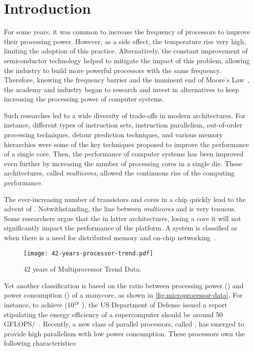 \chapter{Introduction}
\label{ch.intro}

	For some years, it was common to increase the frequency of processors
	to improve their processing power.
	However, as a side effect, the temperature rise very high, limiting the
	adoption of this practice.
	Alternatively, the constant improvement of semiconductor technology helped
	to mitigate the impact of this problem, allowing the industry to build
	more powerful processors with the same frequency.
	Therefore, knowing the frequency barrier and the imminent end of Moore's Law~\cite{moore:1965},
	the academy and industry began to research and invest in alternatives
	to keep increasing the processing power of computer systems.

	Such researches led to a wide diversity of trade-offs in modern architectures.
	For instance, different types of instruction sets, instruction parallelism,
	out-of-order processing techniques, detour prediction techniques, and various
	memory hierarchies were some of the key techniques proposed to improve the
	performance of a single core.
	Then, the performance of computer systems has been improved even further by
	increasing the number of processing cores in a single die.
	These architectures, called \textit{multicores}, allowed the continuous
	rise of the computing performance.

	The ever-increasing number of transistors and cores in a chip quickly lead
	to the advent of \manycores.
	Notwithstanding, the line between \textit{multicores} and \manycores is very tenuous.
	Some researchers argue that the in latter architectures, losing a core it will not
	significantly impact the performance of the platform.
	A system is classified as \manycore when there is a need for distributed
	memory and on-chip networking~\cite{freitas:thesis}.

	\begin{figure}[t]
		\centering%
		\caption{42 years of Multiprocessor Trend Data.}%
		\label{fig:microprocessor-data}%
		\texttt{[image: 42-years-processor-trend.pdf]}%
	\end{figure}

	Yet another classification is based on the ratio between processing power (\flops)
	and power consumption (\watts) of a manycore, as shown in \autoref{fig:microprocessor-data}.
	For instance, to achieve \exascale (10$^{18}$ \flops), the US Department of Defense
	issued a report stipulating the energy efficiency of a supercomputer should be
	around 50 GFLOPS/\watts~\cite{darpa:exascale}.
	Recently, a new class of parallel processors, called \lightweight \manycores,
	has emerged to provide high parallelism with low power consumption.
	These processors own the following characteristics:

